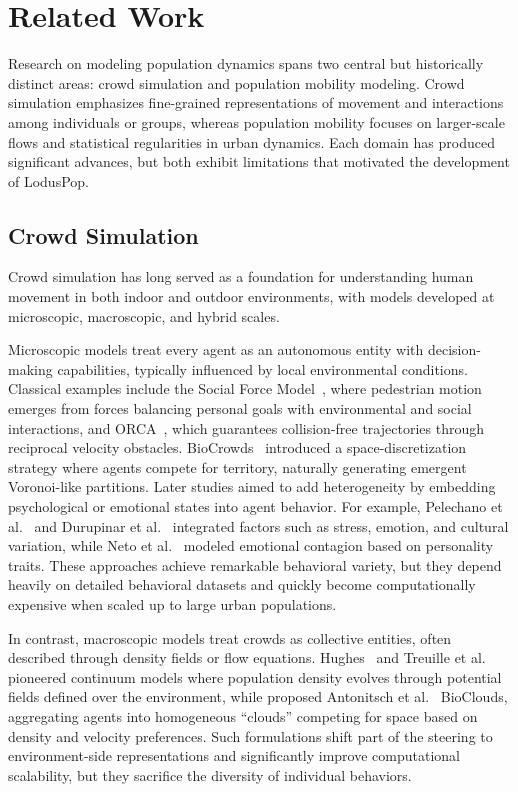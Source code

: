 \chapter{Related Work}
\label{chapter:related_work}

Research on modeling population dynamics spans two central but historically distinct areas: crowd simulation and population mobility modeling. Crowd simulation emphasizes fine-grained representations of movement and interactions among individuals or groups, whereas population mobility focuses on larger-scale flows and statistical regularities in urban dynamics. Each domain has produced significant advances, but both exhibit limitations that motivated the development of LodusPop.

\section{Crowd Simulation}
\label{related:crowd_simulation}

Crowd simulation has long served as a foundation for understanding human movement in both indoor and outdoor environments, with models developed at microscopic, macroscopic, and hybrid scales.

Microscopic models treat every agent as an autonomous entity with decision-making capabilities, typically influenced by local environmental conditions. Classical examples include the Social Force Model~\cite{helbing1995social}, where pedestrian motion emerges from forces balancing personal goals with environmental and social interactions, and ORCA~\cite{van2011reciprocal}, which guarantees collision-free trajectories through reciprocal velocity obstacles. BioCrowds~\cite{de2012simulating} introduced a space-discretization strategy where agents compete for territory, naturally generating emergent Voronoi-like partitions. Later studies aimed to add heterogeneity by embedding psychological or emotional states into agent behavior. For example, Pelechano et al.~\cite{pelechano2005crowd} and Durupinar et al.~\cite{durupinar2015psychological} integrated factors such as stress, emotion, and cultural variation, while Neto et al.~\cite{neto2017giving} modeled emotional contagion based on personality traits. These approaches achieve remarkable behavioral variety, but they depend heavily on detailed behavioral datasets and quickly become computationally expensive when scaled up to large urban populations.

In contrast, macroscopic models treat crowds as collective entities, often described through density fields or flow equations. Hughes~\cite{hughes2002continuum} and Treuille et al.~\cite{treuille2006continuum} pioneered continuum models where population density evolves through potential fields defined over the environment, while proposed Antonitsch et al.~\cite{antonitsch2019bioclouds} BioClouds,
aggregating agents into homogeneous “clouds” competing for space based on density and velocity preferences. Such formulations shift
part of the steering to environment-side representations and significantly improve computational scalability, but they sacrifice the diversity of individual behaviors.

